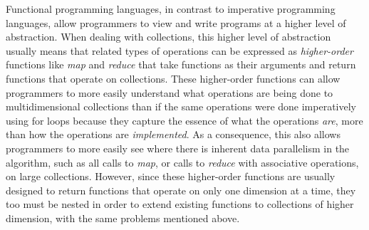 Functional programming languages, in contrast to imperative programming languages, 
allow programmers to view and write programs at a higher level of abstraction. %
When dealing with collections, this higher level of abstraction usually means that related types of operations can be expressed as \textit{higher-order} functions 
like \textit{map} and \textit{reduce} that take functions as their arguments and return functions that operate on collections.
These higher-order functions can allow programmers to more easily understand what operations are being done to multidimensional collections 
than if the same operations were done imperatively using for loops 
because they capture the essence of what the operations \textit{are}, %
more than how the operations are \textit{implemented}.
As a consequence, this %
also allows programmers to more easily see %
where there is inherent data parallelism in the algorithm, such as all calls to \textit{map}, or calls to \textit{reduce} with associative operations, on large collections.
However, since these higher-order functions are usually designed to return functions that operate on only one dimension at a time, 
they too must be nested in order to extend existing functions to collections of higher dimension, with the same problems mentioned above. %

